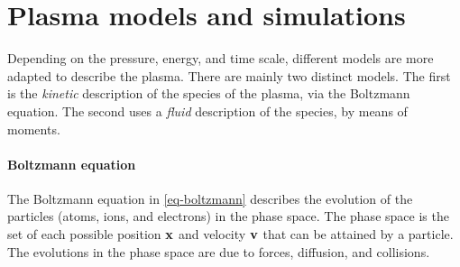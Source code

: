 

\section{Plasma models and simulations}
\label{sec-simulations}

Depending on the pressure, energy, and time scale, different models are more adapted to describe the plasma.
There are mainly two distinct models.
The first is the \emph{kinetic} description of the species of the plasma, via the Boltzmann equation.
The second uses a \emph{fluid} description of the species, by means of moments.
% 


\paragraph{Boltzmann equation \\}
The Boltzmann equation in \cref{eq-boltzmann} describes the evolution of the particles (atoms, ions, and electrons) in the phase space.
The phase space is the set of each possible position ${\mathbf x}$ and velocity ${\mathbf v}$ that can be attained by a particle.
The evolutions in the phase space are due to forces, diffusion, and collisions.

